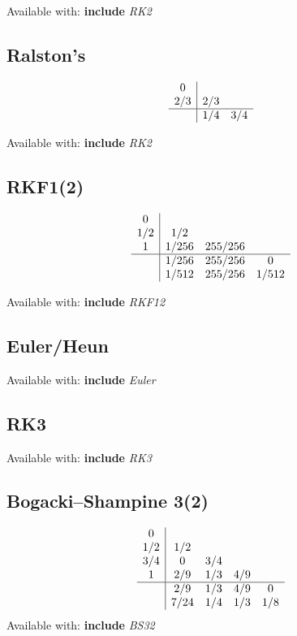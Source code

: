 \documentclass[letterpaper,10pt]{book}
\newcommand{\srcas}[1]{\textbf{include} \textlangle{}\textit{#1}\textrangle{}}
\begin{document}
	Available with: \srcas{RK2}
	
      \subsection{Ralston's}
	\[
	  \begin{array}{c|cc}
	    0 & & \\
	    2/3 & 2/3 & \\
	    \hline
	    & 1/4 & 3/4
	  \end{array}
	\]      

	Available with: \srcas{RK2}

      \subsection{RKF1(2)}
	\[
	  \begin{array}{c|ccc}
	    0 & & &\\
	    1/2 & 1/2 & &\\
	    1 & 1/256 & 255/256 &\\	    
	    \hline
	    & 1/256 & 255/256 & 0\\
	    & 1/512 & 255/256 & 1/512\\
	  \end{array}
	\]    
    
	Available with: \srcas{RKF12}
    
      \subsection{Euler/Heun}
    
    	Available with: \srcas{Euler}

      \subsection{RK3}
	Available with: \srcas{RK3}
    
    
      \subsection{Bogacki–Shampine 3(2)}
	\[
	  \begin{array}{c|cccc}
	    0 & & & &\\
	    1/2 & 1/2 & & &\\
	    3/4 & 0 & 3/4 & &\\	    
	    1 & 2/9 & 1/3 & 4/9 &\\	    
	    \hline
	    & 2/9 & 1/3 & 4/9 & 0\\
	    & 7/24 & 1/4 & 1/3 & 1/8\\
	  \end{array}
	\]    
    	Available with: \srcas{BS32}
\end{document}
